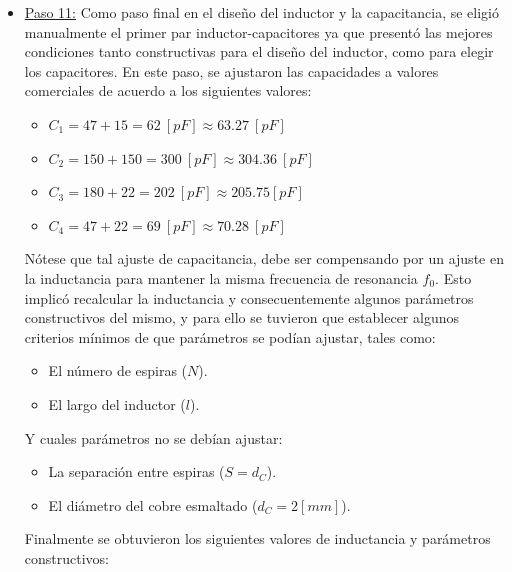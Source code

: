 \documentclass[conference]{IEEEtran}
\begin{document}
\begin{itemize}
\begin{equation}
        C_{2} = \frac{C_{T}}{2}\sqrt{\frac{R_{G}'}{R_{G}}}
        \label{eq_27}
    \end{equation}
    Luego, si se sigue operando sobre \eqref{eq_25}, se pudo despejar a $C_{1}$:
    \begin{equation}
        C_{1} = \frac{\frac{C_{T}}{2}\sqrt{\frac{R_{G}'}{R_{G}}}}{\sqrt{\frac{R_{G}'}{R_{G}}} - 1} = \frac{C_{2}}{\sqrt{\frac{R_{G}'}{R_{G}}} - 1}
        \label{eq_28}
    \end{equation}
    Como se mencionó inicialmente, se tiene que esta demostración es prácticamente la misma para el puerto de salida, de modo que operando sobre \eqref{eq_8} y \eqref{eq_4}, se deduce que:
    \begin{equation}
        C_{3} = \frac{C_{4}}{\sqrt{\frac{R_{L}'}{R_{L}}} - 1}
        \label{eq_29}
    \end{equation}
    \begin{equation}
        C_{4} = \frac{C_{T}}{2}\sqrt{\frac{R_{L}'}{R_{L}}}
        \label{eq_30}
    \end{equation}
    

    \item \underline{Paso 11:} Como paso final en el diseño del inductor y la capacitancia, se eligió manualmente el primer par inductor-capacitores ya que presentó las mejores condiciones tanto constructivas para el diseño del inductor, como para elegir los capacitores.
    En este paso, se ajustaron las capacidades a valores comerciales de acuerdo a los siguientes valores:
    \begin{itemize}
        \item $C_{1} = 47 + 15 = 62 \ [pF] \approx 63.27 \ [pF]$
        \item $C_{2} = 150 + 150 = 300 \ [pF] \approx 304.36 \ [pF]$
        \item $C_{3} = 180 + 22 = 202 \ [pF] \approx 205.75 [pF]$
        \item $C_{4} = 47 + 22 = 69 \ [pF] \approx 70.28 \ [pF]$
    \end{itemize}
    Nótese que tal ajuste de capacitancia, debe ser compensando por un ajuste en la inductancia para mantener la misma frecuencia de resonancia $f_{0}$. Esto implicó recalcular la inductancia y consecuentemente algunos parámetros constructivos del mismo, y para ello se tuvieron que establecer algunos criterios mínimos de que parámetros se podían ajustar, tales como:
    \begin{itemize}
        \item El número de espiras ($N$).
        \item El largo del inductor ($l$).
    \end{itemize}
    Y cuales parámetros no se debían ajustar:
    \begin{itemize}
        \item La separación entre espiras ($S = d_{C}$).
        \item El diámetro del cobre esmaltado ($d_{C} = 2 [mm]$).
    \end{itemize}
    Finalmente se obtuvieron los siguientes valores de inductancia y parámetros constructivos:


\end{itemize}
\end{document}
